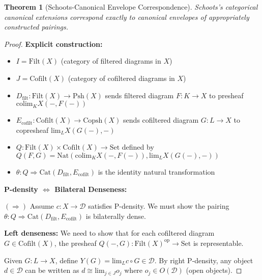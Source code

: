 \documentclass[11pt]{article}
\theoremstyle{plain}
\newtheorem{theorem}{Theorem}[section]
\theoremstyle{definition}
\theoremstyle{remark}
\newcommand{\op}{\mathrm{op}}
\newcommand{\id}{\mathrm{id}}
\newcommand{\colim}{\mathrm{colim}}
\renewcommand{\lim}{\mathrm{lim}}
\begin{document}
\begin{theorem}[Schoots-Canonical Envelope Correspondence]
Schoots's categorical canonical extensions correspond exactly to canonical envelopes of appropriately constructed pairings.
\end{theorem}

\begin{proof}
\textbf{Explicit construction:}
\begin{itemize}
\item $I = \mathrm{Filt}(X)$ (category of filtered diagrams in $X$)
\item $J = \mathrm{Cofilt}(X)$ (category of cofiltered diagrams in $X$)  
\item $D_{\text{filt}} : \mathrm{Filt}(X) \to \mathrm{Psh}(X)$ sends filtered diagram $F : K \to X$ to presheaf $\colim_K X(-, F(-))$
\item $E_{\text{cofilt}} : \mathrm{Cofilt}(X) \to \mathrm{Copsh}(X)$ sends cofiltered diagram $G : L \to X$ to copresheaf $\lim_L X(G(-), -)$
\item $Q : \mathrm{Filt}(X) \times \mathrm{Cofilt}(X) \to \mathrm{Set}$ defined by $Q(F,G) = \mathrm{Nat}(\colim_K X(-, F(-)), \lim_L X(G(-), -))$
\item $\theta : Q \Rightarrow \mathrm{Cat}(D_{\text{filt}}, E_{\text{cofilt}})$ is the identity natural transformation
\end{itemize}

\begin{center}
\end{center}

\textbf{P-density $\Leftrightarrow$ Bilateral Denseness:} 

$(\Rightarrow)$ Assume $c : X \to \mathcal{D}$ satisfies P-density. We must show the pairing $\theta : Q \Rightarrow \mathrm{Cat}(D_{\text{filt}}, E_{\text{cofilt}})$ is bilaterally dense.

\textbf{Left denseness:} We need to show that for each cofiltered diagram $G \in \mathrm{Cofilt}(X)$, the presheaf $Q(-, G) : \mathrm{Filt}(X)^{\op} \to \mathrm{Set}$ is representable.

Given $G : L \to X$, define $Y(G) = \lim_L c \circ G \in \mathcal{D}$. By right P-density, any object $d \in \mathcal{D}$ can be written as $d \cong \lim_{j \in J} o_j$ where $o_j \in O(\mathcal{D})$ (open objects).


\end{proof}
\end{document}
